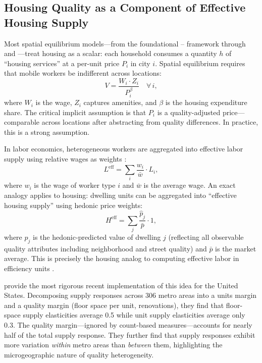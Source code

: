 \documentclass[12pt,a4paper]{article}
\begin{document}
\subsection{Housing Quality as a Component of Effective Housing Supply}
\label{sec:lit_effhs}

Most spatial equilibrium models—from the foundational \citet{rosen1979}–\citet{roback1982} framework through \citet{moretti2011} and \citet{hsieh2019}—treat
housing as a scalar: each household consumes a quantity $h$ of ``housing
services'' at a per-unit price $P_i$ in city $i$.  Spatial equilibrium requires
that mobile workers be indifferent across locations:
\begin{equation}
\label{eq:spatial_eq}
  V = \frac{W_i \cdot Z_i}{P_i^\beta} \quad \forall\, i,
\end{equation}
where $W_i$ is the wage, $Z_i$ captures amenities, and $\beta$ is the housing
expenditure share.  The critical implicit assumption is that $P_i$ is a
quality-adjusted price—comparable across locations after abstracting from
quality differences.  In practice, this is a strong assumption.

In labor economics, heterogeneous workers are aggregated into effective labor
supply using relative wages as weights \citep{katz1992changes}:
\begin{equation}
\label{eq:efflabor}
  L^{\text{eff}} = \sum_i \frac{w_i}{\bar{w}} \cdot L_i,
\end{equation}
where $w_i$ is the wage of worker type $i$ and $\bar{w}$ is the average wage.
An exact analogy applies to housing: dwelling units can be aggregated into
``effective housing supply'' using hedonic price weights:
\begin{equation}
\label{eq:effhs}
  H^{\text{eff}} = \sum_j \frac{\hat{p}_j}{\bar{p}} \cdot 1,
\end{equation}
where $\hat{p}_j$ is the hedonic-predicted value of dwelling $j$ (reflecting
all observable quality attributes including neighborhood and street quality)
and $\bar{p}$ is the market average.  This is precisely the housing analog
to computing effective labor in efficiency units \citep{barnett1979}.

\citet{baumsnow2024} provide the most rigorous recent implementation of this
idea for the United States.  Decomposing supply responses across 306 metro
areas into a units margin and a quality margin (floor space per unit,
renovations), they find that floor-space supply elasticities average 0.5 while
unit supply elasticities average only 0.3.  The quality margin—ignored by
count-based measures—accounts for nearly half of the total supply response.
They further find that supply responses exhibit more variation \textit{within}
metro areas than \textit{between} them, highlighting the microgeographic
nature of quality heterogeneity.
\end{document}
